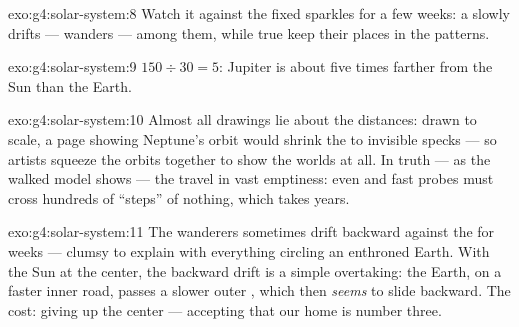 \begin{solution}{exo:g4:solar-system:8}
Watch it against the fixed sparkles for a few weeks: a 
slowly drifts --- wanders --- among them, while true  keep
their places in the patterns.
\end{solution}

\begin{solution}{exo:g4:solar-system:9}
$150 \div 30 = 5$: Jupiter is about five times farther from the Sun
than the Earth.
\end{solution}

\begin{solution}{exo:g4:solar-system:10}
Almost all drawings lie about the distances: drawn to scale, a page
showing Neptune's orbit would shrink the  to invisible
specks --- so artists squeeze the orbits together to show the
worlds at all. In truth --- as the walked model shows --- the
 travel in vast emptiness: even  and fast probes must
cross hundreds of ``steps'' of nothing, which takes years.
\end{solution}

\begin{solution}{exo:g4:solar-system:11}
The wanderers sometimes drift backward against the  for weeks
--- clumsy to explain with everything circling an enthroned Earth.
With the Sun at the center, the backward drift is a simple
overtaking: the Earth, on a faster inner road, passes a slower
outer , which then \emph{seems} to slide backward. The cost:
giving up the center --- accepting that our home is  number
three.
\end{solution}
